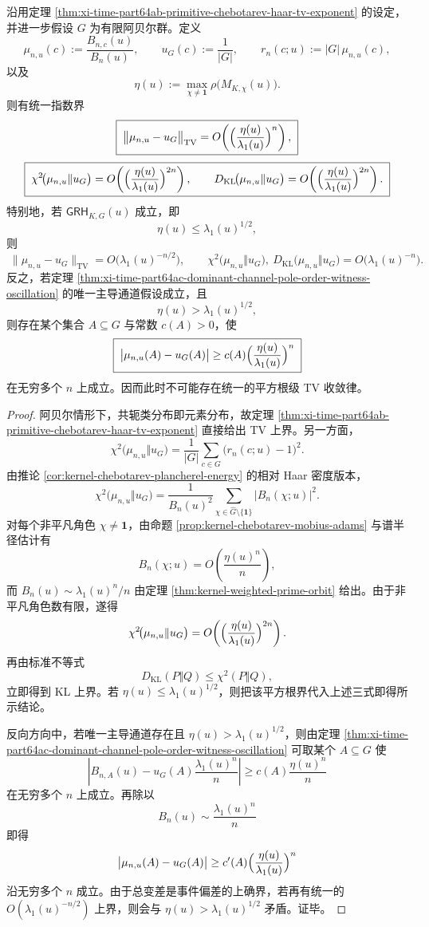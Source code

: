 \begin{theorem}\label{thm:xi-time-part64ac-grh-tv-chi2-kl-barrier}
沿用定理 \ref{thm:xi-time-part64ab-primitive-chebotarev-haar-tv-exponent} 的设定，并进一步假设 \(G\) 为有限阿贝尔群。定义
\[
\mu_{n,u}(c):=\frac{B_{n,c}(u)}{B_n(u)},
\qquad
u_G(c):=\frac{1}{|G|},
\qquad
r_n(c;u):=|G|\,\mu_{n,u}(c),
\]
以及
\[
\eta(u):=\max_{\chi\neq \mathbf{1}}\rho\!\bigl(M_{K,\chi}(u)\bigr).
\]
则有统一指数界
\[
\boxed{\;
\bigl\|\mu_{n,u}-u_G\bigr\|_{\mathrm{TV}}
=
O\!\left(\Bigl(\frac{\eta(u)}{\lambda_1(u)}\Bigr)^n\right),\;}
\]
\[
\boxed{\;
\chi^2\!\bigl(\mu_{n,u}\Vert u_G\bigr)
=
O\!\left(\Bigl(\frac{\eta(u)}{\lambda_1(u)}\Bigr)^{2n}\right),\qquad
D_{\mathrm{KL}}\!\bigl(\mu_{n,u}\Vert u_G\bigr)
=
O\!\left(\Bigl(\frac{\eta(u)}{\lambda_1(u)}\Bigr)^{2n}\right).\;}
\]
特别地，若 \(\textsf{GRH}_{K,G}(u)\) 成立，即
\[
\eta(u)\le \lambda_1(u)^{1/2},
\]
则
\[
\boxed{\;
\bigl\|\mu_{n,u}-u_G\bigr\|_{\mathrm{TV}}=O\!\bigl(\lambda_1(u)^{-n/2}\bigr),\qquad
\chi^2\!\bigl(\mu_{n,u}\Vert u_G\bigr),\
D_{\mathrm{KL}}\!\bigl(\mu_{n,u}\Vert u_G\bigr)
=
O\!\bigl(\lambda_1(u)^{-n}\bigr).\;}
\]
反之，若定理 \ref{thm:xi-time-part64ac-dominant-channel-pole-order-witness-oscillation} 的唯一主导通道假设成立，且
\[
\eta(u)>\lambda_1(u)^{1/2},
\]
则存在某个集合 \(A\subseteq G\) 与常数 \(c(A)>0\)，使
\[
\boxed{\;
\bigl|\mu_{n,u}(A)-u_G(A)\bigr|
\ge
c(A)\Bigl(\frac{\eta(u)}{\lambda_1(u)}\Bigr)^n\; }
\]
在无穷多个 \(n\) 上成立。因而此时不可能存在统一的平方根级 TV 收敛律。
\end{theorem}
\begin{proof}
阿贝尔情形下，共轭类分布即元素分布，故定理 \ref{thm:xi-time-part64ab-primitive-chebotarev-haar-tv-exponent} 直接给出 TV 上界。另一方面，
\[
\chi^2\!\bigl(\mu_{n,u}\Vert u_G\bigr)
=
\frac{1}{|G|}\sum_{c\in G}\bigl(r_n(c;u)-1\bigr)^2.
\]
由推论 \ref{cor:kernel-chebotarev-plancherel-energy} 的相对 Haar 密度版本，
\[
\chi^2\!\bigl(\mu_{n,u}\Vert u_G\bigr)
=
\frac{1}{B_n(u)^2}
\sum_{\chi\in\widehat G\setminus\{\mathbf{1}\}}
\bigl|B_n(\chi;u)\bigr|^2.
\]
对每个非平凡角色 \(\chi\neq \mathbf{1}\)，由命题 \ref{prop:kernel-chebotarev-mobius-adams} 与谱半径估计有
\[
B_n(\chi;u)=O\!\left(\frac{\eta(u)^n}{n}\right),
\]
而 \(B_n(u)\sim \lambda_1(u)^n/n\) 由定理 \ref{thm:kernel-weighted-prime-orbit} 给出。由于非平凡角色数有限，遂得
\[
\chi^2\!\bigl(\mu_{n,u}\Vert u_G\bigr)
=
O\!\left(\Bigl(\frac{\eta(u)}{\lambda_1(u)}\Bigr)^{2n}\right).
\]
再由标准不等式
\[
D_{\mathrm{KL}}(P\Vert Q)\le \chi^2(P\Vert Q),
\]
立即得到 KL 上界。若 \(\eta(u)\le \lambda_1(u)^{1/2}\)，则把该平方根界代入上述三式即得所示结论。

反向方向中，若唯一主导通道存在且 \(\eta(u)>\lambda_1(u)^{1/2}\)，则由定理
\ref{thm:xi-time-part64ac-dominant-channel-pole-order-witness-oscillation}
可取某个 \(A\subseteq G\) 使
\[
\left|B_{n,A}(u)-u_G(A)\frac{\lambda_1(u)^n}{n}\right|
\ge
c(A)\frac{\eta(u)^n}{n}
\]
在无穷多个 \(n\) 上成立。再除以
\[
B_n(u)\sim \frac{\lambda_1(u)^n}{n}
\]
即得
\[
\bigl|\mu_{n,u}(A)-u_G(A)\bigr|
\ge
c'(A)\Bigl(\frac{\eta(u)}{\lambda_1(u)}\Bigr)^n
\]
沿无穷多个 \(n\) 成立。由于总变差是事件偏差的上确界，若再有统一的 \(O(\lambda_1(u)^{-n/2})\) 上界，则会与 \(\eta(u)>\lambda_1(u)^{1/2}\) 矛盾。证毕。
\end{proof}

